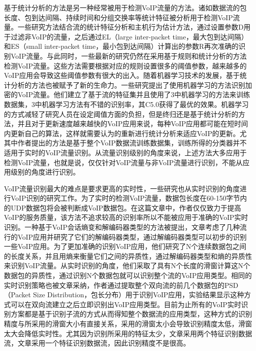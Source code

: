 基于统计分析的方法是另一种经常被用于检测VoIP流量的方法。诸如数据流的包长度、包到达间隔、持续时间和分组交换率等统计特征被分析用于检测VoIP流量\supercite{2}。一些研究方法\supercite{19}结合流的统计特征分析和主机行为估计方法，通过设置参数D用于过滤非VoIP的流量，之后通过EL（large inter-packet time，最大包到达间隔）和ES（small inter-packet time，最小包到达间隔）计算出的参数R再次准确的识别VoIP流量。与此同时，一些最新的研究\supercite{20,21}仍然在采用基于规则和统计分析的方法检测VoIP流量。这些方法需要根据对应的规则设置很多的阈值参数，越来越多的VoIP应用会导致这些阈值参数有很大的出入。随着机器学习技术的发展，基于统计分析的方法也被赋予了新的生命力。一些研究\supercite{5}提出了使用机器学习的方法识别加密的VoIP流量。他们建立了基于流的特征集并且使用了3中机器学习的方法来训练数据集，3中机器学习方法有不错的识别率，其C5.0获得了最优的效果。机器学习的方式减轻了研究人员在设定阈值方面的负担，但是终归还是基于统计分析的方法，并且对于更新速度越来越快的VoIP应用来说，每种VoIP应用都可能在短时间内更新自己的算法，这样就需要认为的重新进行统计分析来适应VoIP的更新。尤其中作者提出的方法是基于整个VoIP数据流训练数据集，训练所得的分类器并不适用于实时的VoIP流量识别。从流量识别级别的角度来说，上述方法大多应用于检测VoIP流量，也就是说，仅仅针对VoIP流量与非VoIP流量进行识别，不能从应用级别的角度进行识别。

VoIP流量识别最大的难点是要求更高的实时性，一些研究也从实时识别的角度进行VoIP识别的研究工作。为了实时的检测VoIP流量，数据包长度在60-150字节内的UDP数据包将会被判断成VoIP数据包\supercite{3}。在这篇文章中，作者仅仅致力于提高VoIP的服务质量，该方法不追求较高的识别率所以不能被应用于准确的VoIP实时识别。一种基于VoIP会话熵变和解编码器类型的方法被提出\supercite{4}，文章考虑了几种流行的VoIP应用并研究了它们的解编码器类型，通过解编码器类型可以初步的识别一些VoIP应用。为了更加准确的识别VoIP应用，他们研究了N个连续数据包之间的长度关系，并且用熵来衡量它们之间的异质性，通过解编码器类型和熵的异质性来识别VoIP流量。从实时识别的角度，他们采取了具有N个长度的滑窗计算这N个数据包的异质性，通过识别N个数据包就可以识别整个流的VoIP应用类型。相同的实时识别策略也被文章\supercite{22}采纳，作者通过提取整个双向流的前几个数据包的PSD（Packet Size Distribution，包长分布）用于识别VoIP应用，实验结果显示这种方式可以在双向流建立之后立即识别出VoIP应用类型。目前为止所有的VoIP实时识别方案都是基于识别子流的方式从而得知整个数据流的应用类型，这种方式的识别精度与所采用的滑窗大小有直接关系，采用的滑窗太小会导致识别精度太低，滑窗太大会降低实时性。尤其因为识别所采用的特征太少，文章\supercite{4}采用两个特征识别数据流，文章\supercite{22}采用一个特征识别数据流，因此识别精度不是很高。

